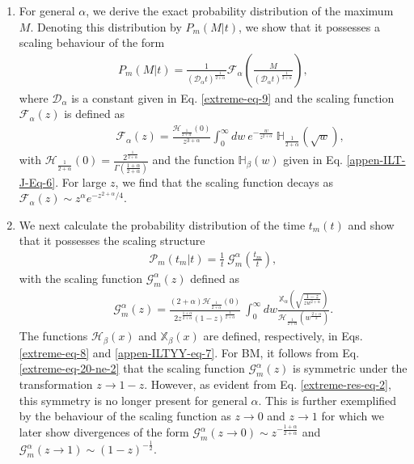 \documentclass[showpacs,amsmath,amssymb,aps,pre,twocolumn,]{revtex4-1}
\begin{document}
\begin{enumerate}
\item For general $\alpha$, we derive the exact probability distribution of the maximum $M$. Denoting this distribution by $P_m(M|t)$, we show that it possesses a scaling behaviour of the form
\begin{align}
P_m(M|t) = \frac{1}{\left( \mathcal{D}_{\alpha} t\right)^{\frac{1}{2+\alpha}}} \mathcal{F}_{\alpha} \left( \frac{M}{\left( \mathcal{D}_{\alpha} t\right)^{\frac{1}{2+\alpha}}} \right),
\label{extreme-eq-17} 
\end{align}
where $\mathcal{D}_{\alpha}$ is a constant given in Eq. \eqref{extreme-eq-9} and the scaling function $\mathcal{F}_{\alpha}(z)$ is defined as
\begin{align}
~~~~~~~~~~& \mathcal{F}_{\alpha}(z) = \frac{\mathcal{H}_{\frac{1}{2+\alpha}} \left(0 \right)}{z^{3+\alpha}} \int _{0}^{\infty} dw ~e^{-\frac{w}{z^{2+\alpha}}} ~\mathbb{H}_{\frac{1}{2+\alpha}}(\sqrt{w}), \label{extreme-eq-18} 
\end{align}
with $ \mathcal{H}_{\frac{1}{2+\alpha}} \left(0 \right)=\frac{2^{\frac{1}{2+\alpha}}}{\Gamma \left( \frac{1+\alpha}{2+\alpha}\right)}$ and the function $\mathbb{H}_{\beta}(w)$ given in Eq. \eqref{appen-ILT-J-Eq-6}. For large $z$, we find that the scaling function decays as $\mathcal{F}_{\alpha}(z) \sim z^{\alpha} e^{-z^{2+\alpha}/4}$.

\item We next calculate the probability distribution of the time $t_m(t)$ and show that it possesses the scaling structure
\begin{align}
\mathcal{P}_m(t_m|t) = \frac{1}{t} ~\mathcal{G} _{m}^{\alpha} \left( \frac{t_m}{t}\right),
\label{extreme-res-eq-1}
\end{align}
with the scaling function $\mathcal{G} _{m}^{\alpha} \left( z \right)$ defined as
\begin{align}
~~~~~~~~\mathcal{G} _{m}^{\alpha} \left( z \right) = \frac{(2+\alpha)\mathcal{H}_{\frac{1}{2+\alpha}} \left(0 \right)}{2z^{\frac{1+\alpha}{2+\alpha}} (1-z)^{\frac{1}{2+\alpha}}}~\int _{0}^{\infty} dw\frac{\mathbb{X}_{\alpha} \left( \sqrt{\frac{1-z}{z w^{2+\alpha}}} \right)}{\mathcal{H}_{\frac{1}{2+\alpha}}\left( w^{\frac{2+\alpha}{2}}\right)}.
\label{extreme-res-eq-2}
\end{align}
The functions $\mathcal{H}_{\beta}(x)$ and $\mathbb{X}_{\beta}(x)$ are defined, respectively, in Eqs. \eqref{extreme-eq-8} and \eqref{appen-ILTYY-eq-7}. For BM, it follows from Eq. \eqref{extreme-eq-20-ne-2} that the scaling function $\mathcal{G} _{m}^{\alpha} \left( z \right)$ is symmetric under the transformation $z \to 1-z$. However, as evident from Eq. \eqref{extreme-res-eq-2}, this symmetry is no longer present for general $\alpha$. This is further exemplified by the behaviour of the scaling function as $z \to 0$ and $z \to 1$ for which we later show divergences of the form $\mathcal{G} _{m}^{\alpha} \left( z \to 0 \right) \sim z^{-\frac{1+\alpha}{2+\alpha}}$ and $\mathcal{G} _{m}^{\alpha} \left( z \to 1 \right) \sim (1-z)^{-\frac{1}{2}}$.



\end{enumerate}
\end{document}
